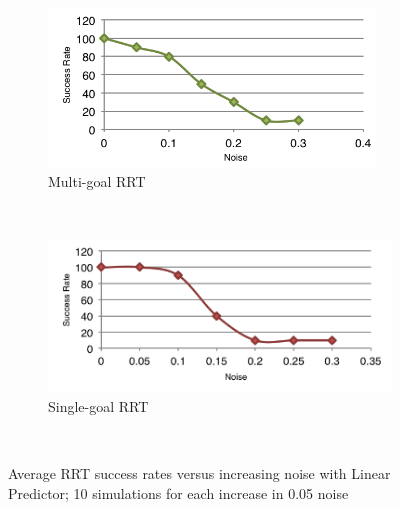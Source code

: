 \documentclass[letterpaper, 10 pt, conference]{ieeeconf}  %
\begin{document}
\begin{figure}
        \centering
        \begin{subfigure}[b]{0.22\textwidth}
                \centering
                \includegraphics[width=\textwidth]{fig/multi}
                \caption{Multi-goal RRT}
                \label{fig:multi}
        \end{subfigure}%
        ~ %
        \begin{subfigure}[b]{0.24\textwidth}
                \centering
                \includegraphics[width=\textwidth]{fig/single}
                \caption{Single-goal RRT}
                \label{fig:single}
        \end{subfigure}
        ~ %
        \caption{Average RRT success rates versus increasing noise
        with Linear Predictor; 10 simulations for each increase in 0.05
      noise}\label{fig:rrts}
\end{figure}
\end{document}
